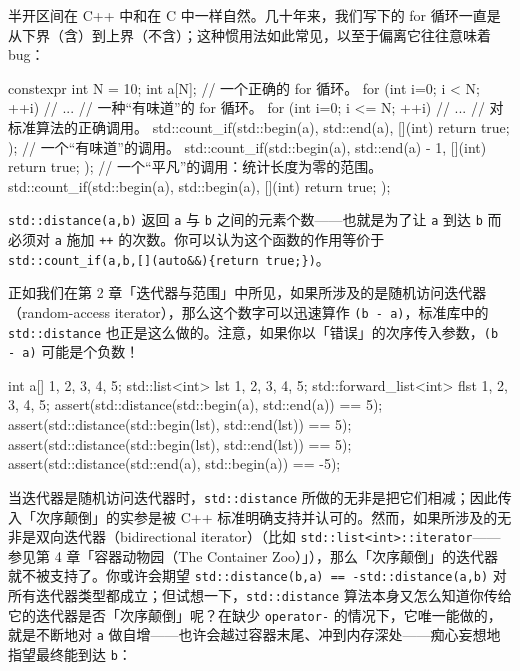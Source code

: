 半开区间在 C++ 中和在 C 中一样自然。几十年来，我们写下的 for 循环一直是从下界（含）到上界（不含）；这种惯用法如此常见，以至于偏离它往往意味着 bug：

\begin{codebox}[cpp]
    constexpr int N = 10;
    int a[N];
    // 一个正确的 for 循环。
    for (int i=0; i < N; ++i) {
      // ...
    }
    // 一种“有味道”的 for 循环。
    for (int i=0; i <= N; ++i) {
      // ...
    }
    // 对标准算法的正确调用。
    std::count_if(std::begin(a), std::end(a), [](int){ return true; });
    // 一个“有味道”的调用。
    std::count_if(std::begin(a), std::end(a) - 1, [](int){ return true; });
    // 一个“平凡”的调用：统计长度为零的范围。
    std::count_if(std::begin(a), std::begin(a), [](int){ return true; });
\end{codebox}

\texttt{std::\allowbreak{}distance(\allowbreak{}a,\allowbreak{}b)\allowbreak{}} 返回 \texttt{a} 与 \texttt{b} 之间的元素个数——也就是为了让 \texttt{a} 到达 \texttt{b} 而必须对 \texttt{a} 施加 \texttt{++} 的次数。你可以认为这个函数的作用等价于 \texttt{std::\allowbreak{}count\_\allowbreak{}if(\allowbreak{}a,\allowbreak{}b,\allowbreak{}[](\allowbreak{}auto\&\&)\allowbreak{}\{return true;\})}。

正如我们在第 2 章「迭代器与范围」中所见，如果所涉及的是随机访问迭代器（random-access iterator），那么这个数字可以迅速算作 \texttt{(\allowbreak{}b - a)\allowbreak{}}，标准库中的 \texttt{std::\allowbreak{}distance} 也正是这么做的。注意，如果你以「错误」的次序传入参数，\texttt{(\allowbreak{}b - a)\allowbreak{}} 可能是个负数！

\begin{codebox}[cpp]
    int a[] {1, 2, 3, 4, 5};
    std::list<int> lst {1, 2, 3, 4, 5};
    std::forward_list<int> flst {1, 2, 3, 4, 5};
    assert(std::distance(std::begin(a), std::end(a)) == 5);
    assert(std::distance(std::begin(lst), std::end(lst)) == 5);
    assert(std::distance(std::begin(lst), std::end(lst)) == 5);
    assert(std::distance(std::end(a), std::begin(a)) == -5);
\end{codebox}

当迭代器是随机访问迭代器时，\texttt{std::\allowbreak{}distance} 所做的无非是把它们相减；因此传入「次序颠倒」的实参是被 C++ 标准明确支持并认可的。然而，如果所涉及的无非是双向迭代器（bidirectional iterator）（比如 \texttt{std::\allowbreak{}list<\allowbreak{}int>\allowbreak{}::\allowbreak{}iterator}——参见第 4 章「容器动物园（The Container Zoo）」），那么「次序颠倒」的迭代器就不被支持了。你或许会期望 \texttt{std::\allowbreak{}distance(\allowbreak{}b,\allowbreak{}a)\allowbreak{} == -std::\allowbreak{}distance(\allowbreak{}a,\allowbreak{}b)\allowbreak{}} 对所有迭代器类型都成立；但试想一下，\texttt{std::\allowbreak{}distance} 算法本身又怎么知道你传给它的迭代器是否「次序颠倒」呢？在缺少 \texttt{operator-} 的情况下，它唯一能做的，就是不断地对 \texttt{a} 做自增——也许会越过容器末尾、冲到内存深处——痴心妄想地指望最终能到达 \texttt{b}：

